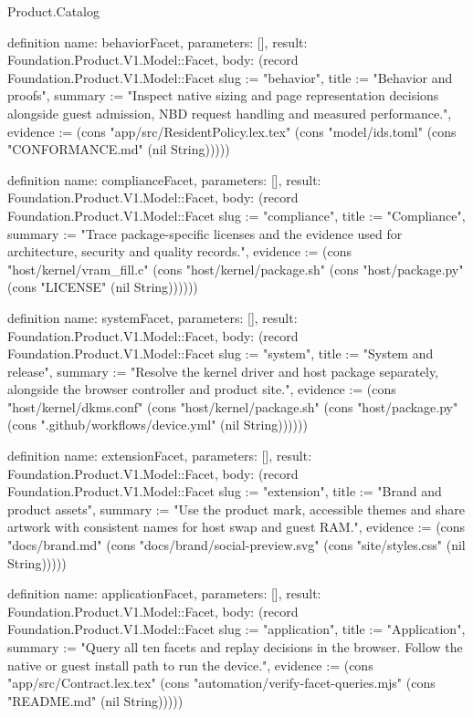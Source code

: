 \begin{lexlean}{Product.Catalog}
\begin{semanticmodule}
definition{
  name: behaviorFacet, parameters: [], result: Foundation.Product.V1.Model::Facet,
  body: (record Foundation.Product.V1.Model::Facet {slug := "behavior", title := "Behavior and proofs", summary := "Inspect native sizing and page representation decisions alongside guest admission, NBD request handling and measured performance.", evidence := (cons "app/src/ResidentPolicy.lex.tex" (cons "model/ids.toml" (cons "CONFORMANCE.md" (nil String))))})
}

definition{
  name: complianceFacet, parameters: [], result: Foundation.Product.V1.Model::Facet,
  body: (record Foundation.Product.V1.Model::Facet {slug := "compliance", title := "Compliance", summary := "Trace package-specific licenses and the evidence used for architecture, security and quality records.", evidence := (cons "host/kernel/vram_fill.c" (cons "host/kernel/package.sh" (cons "host/package.py" (cons "LICENSE" (nil String)))))})
}

definition{
  name: systemFacet, parameters: [], result: Foundation.Product.V1.Model::Facet,
  body: (record Foundation.Product.V1.Model::Facet {slug := "system", title := "System and release", summary := "Resolve the kernel driver and host package separately, alongside the browser controller and product site.", evidence := (cons "host/kernel/dkms.conf" (cons "host/kernel/package.sh" (cons "host/package.py" (cons ".github/workflows/device.yml" (nil String)))))})
}

definition{
  name: extensionFacet, parameters: [], result: Foundation.Product.V1.Model::Facet,
  body: (record Foundation.Product.V1.Model::Facet {slug := "extension", title := "Brand and product assets", summary := "Use the product mark, accessible themes and share artwork with consistent names for host swap and guest RAM.", evidence := (cons "docs/brand.md" (cons "docs/brand/social-preview.svg" (cons "site/styles.css" (nil String))))})
}

definition{
  name: applicationFacet, parameters: [], result: Foundation.Product.V1.Model::Facet,
  body: (record Foundation.Product.V1.Model::Facet {slug := "application", title := "Application", summary := "Query all ten facets and replay decisions in the browser. Follow the native or guest install path to run the device.", evidence := (cons "app/src/Contract.lex.tex" (cons "automation/verify-facet-queries.mjs" (cons "README.md" (nil String))))})
}
\end{semanticmodule}
\end{lexlean}
